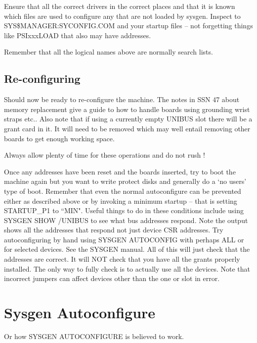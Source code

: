  Ensure that all the correct drivers in the correct places
 and that it is known which files are used to configure any that are not loaded
 by sysgen. Inspect to SYS\$MANAGER:SYCONFIG.COM and your startup files -- not
 forgetting things like PSIxxxLOAD that also may have addresses.

 Remember that all the logical names above are normally search lists.

\subsection{Re-configuring}

Should now be ready to re-configure the machine.
The notes in SSN 47 about memory replacement give a guide to how to handle
boards using  grounding wrist straps etc..
Also note that if using a currently  empty UNIBUS slot there will be a grant
card in it. It will need to be removed which may well entail removing other
boards to get enough working space. 

Always allow plenty of time for these operations and do not rush !

Once any addresses have been reset and the boards inserted,
try to boot the machine again but you want to write protect disks and 
generally do a `no users' type of boot.
Remember that even the normal autoconfigure can be prevented either as 
described above or by invoking a minimum startup -- that is setting 
STARTUP\_P1 to ``MIN".
Useful things  to do in these conditions include using
SYSGEN SHOW /UNIBUS to see what  bus addresses respond.
Note the output shows all the addresses that respond not just device CSR
addresses.
Try autoconfiguring  by hand using SYSGEN AUTOCONFIG  with perhaps ALL or for
selected devices.
See  the SYSGEN manual.
All of this will just check that the addresses are correct.
It will NOT check that you have all the grants properly installed.
The  only way to fully check is to actually use all the
devices.
Note that  incorrect jumpers can affect devices other than the one
or slot in error. 

\appendix
\section{Sysgen Autoconfigure}

Or how SYSGEN AUTOCONFIGURE is believed to work.

